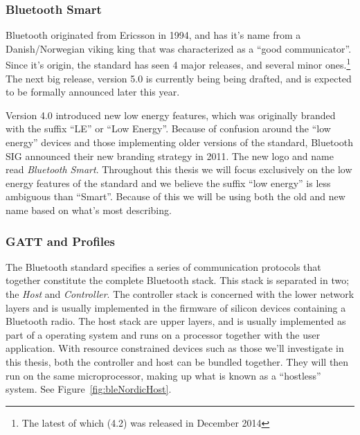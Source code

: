\subsubsection{Bluetooth Smart} %
\label{ssub:bluetooth}

Bluetooth originated from Ericsson in 1994, and has it's name from a Danish/Norwegian viking king that was characterized as a ``good communicator''. Since it's origin, the standard has seen 4 major releases, and several minor ones.\footnote{ The latest of which (4.2) was released in December 2014} The next big release, version 5.0 is currently being being drafted, and is expected to be formally announced later this year. 

Version 4.0 introduced new low energy features, which was originally branded with the suffix ``LE'' or ``Low Energy''. Because of confusion around the ``low energy'' devices and those implementing older versions of the standard, Bluetooth SIG announced their new branding strategy in 2011. The new logo and name read \textit{Bluetooth Smart}. Throughout this thesis we will focus exclusively on the low energy features of the standard and we believe the suffix ``low energy'' is less ambiguous than ``Smart''. Because of this we will be using both the old and new name based on what's most describing.


\subsubsection{GATT and Profiles} %
\label{ssub:gatt_and_profiles}

The Bluetooth standard specifies a series of communication protocols that together constitute the complete Bluetooth stack. This stack is separated in two; the \emph{Host} and \emph{Controller}. The controller stack is concerned with the lower network layers and is usually implemented in the firmware of silicon devices containing a Bluetooth radio. The host stack are upper layers, and is usually implemented as part of a operating system and runs on a processor together with the user application. With resource constrained devices such as those we'll investigate in this thesis, both the controller and host can be bundled together. They will then run on the same microprocessor, making up what is known as a ``hostless'' system. See Figure~\ref{fig:bleNordicHost}. 


